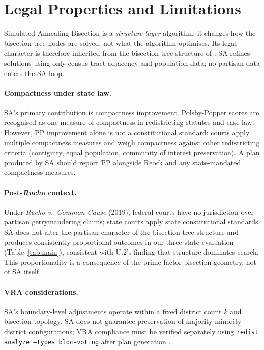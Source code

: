 \section{Legal Properties and Limitations}
\label{sec:legal}

Simulated Annealing Bisection is a \emph{structure-layer} algorithm: it
changes how the bisection tree nodes are solved, not what the algorithm
optimises.
Its legal character is therefore inherited from the bisection tree structure
of \ar{} \citep{dellaLibera2026apportion}.
SA refines \metis{} solutions using only census-tract adjacency and
population data; no partisan data enters the SA loop.

\paragraph{Compactness under state law.}
SA's primary contribution is compactness improvement.
Polsby-Popper scores are recognised as one measure of compactness in
redistricting statutes and case law.
However, PP improvement alone is not a constitutional standard: courts apply
multiple compactness measures and weigh compactness against other
redistricting criteria (contiguity, equal population, community of interest
preservation).
A plan produced by SA should report PP alongside Reock and any
state-mandated compactness measures.

\paragraph{Post-\textit{Rucho} context.}
Under \textit{Rucho v.\ Common Cause} (2019), federal courts have no
jurisdiction over partisan gerrymandering claims; state courts apply state
constitutional standards.
SA does not alter the partisan character of the bisection tree structure and
produces consistently proportional outcomes in our three-state evaluation
(Table~\ref{tab:main}), consistent with U.2's finding that structure
dominates search.
This proportionality is a consequence of the prime-factor bisection
geometry, not of SA itself.

\paragraph{VRA considerations.}
SA's boundary-level adjustments operate within a fixed district count $k$
and bisection topology.
SA does not guarantee preservation of majority-minority district
configurations; VRA compliance must be verified separately using
\texttt{redist analyze --types bloc-voting} after plan generation
\citep{dellaLibera2026callais}.

